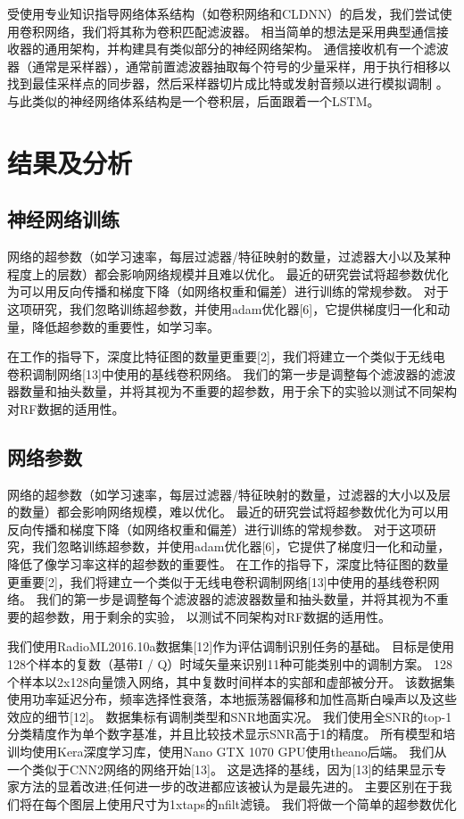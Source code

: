 受使用专业知识指导网络体系结构（如卷积网络和CLDNN）的启发，我们尝试使用卷积网络，我们将其称为卷积匹配滤波器。 相当简单的想法是采用典型通信接收器的通用架构，并构建具有类似部分的神经网络架构。 通信接收机有一个滤波器（通常是采样器），通常前置滤波器抽取每个符号的少量采样，用于执行相移以找到最佳采样点的同步器，然后采样器切片成比特或发射音频以进行模拟调制 。与此类似的神经网络体系结构是一个卷积层，后面跟着一个LSTM。\par


\section{结果及分析}

\subsection{神经网络训练}

网络的超参数（如学习速率，每层过滤器/特征映射的数量，过滤器大小以及某种程度上的层数）都会影响网络规模并且难以优化。 最近的研究尝试将超参数优化为可以用反向传播和梯度下降（如网络权重和偏差）进行训练的常规参数。 对于这项研究，我们忽略训练超参数，并使用adam优化器[6]，它提供梯度归一化和动量，降低超参数的重要性，如学习率。

在工作的指导下，深度比特征图的数量更重要[2]，我们将建立一个类似于无线电卷积调制网络[13]中使用的基线卷积网络。 我们的第一步是调整每个滤波器的滤波器数量和抽头数量，并将其视为不重要的超参数，用于余下的实验以测试不同架构对RF数据的适用性。


\subsection{网络参数}

网络的超参数（如学习速率，每层过滤器/特征映射的数量，过滤器的大小以及层的数量）都会影响网络规模，难以优化。
最近的研究尝试将超参数优化为可以用反向传播和梯度下降（如网络权重和偏差）进行训练的常规参数。
对于这项研究，我们忽略训练超参数，并使用adam优化器[6]，它提供了梯度归一化和动量，降低了像学习率这样的超参数的重要性。
在工作的指导下，深度比特征图的数量更重要[2]，我们将建立一个类似于无线电卷积调制网络[13]中使用的基线卷积网络。
我们的第一步是调整每个滤波器的滤波器数量和抽头数量，并将其视为不重要的超参数，用于剩余的实验，
以测试不同架构对RF数据的适用性。\par

我们使用RadioML2016.10a数据集[12]作为评估调制识别任务的基础。
目标是使用128个样本的复数（基带I / Q）时域矢量来识别11种可能类别中的调制方案。 
128个样本以2x128向量馈入网络，其中复数时间样本的实部和虚部被分开。
该数据集使用功率延迟分布，频率选择性衰落，本地振荡器偏移和加性高斯白噪声以及这些效应的细节[12]。
数据集标有调制类型和SNR地面实况。
我们使用全SNR的top-1分类精度作为单个数字基准，并且比较技术显示SNR高于1的精度。
所有模型和培训均使用Kera深度学习库，使用Nano GTX 1070 GPU使用theano后端。
我们从一个类似于CNN2网络的网络开始[13]。
这是选择的基线，因为[13]的结果显示专家方法的显着改进;任何进一步的改进都应该被认为是最先进的。
主要区别在于我们将在每个图层上使用尺寸为1xtaps的nfilt滤镜。
我们将做一个简单的超参数优化\par

